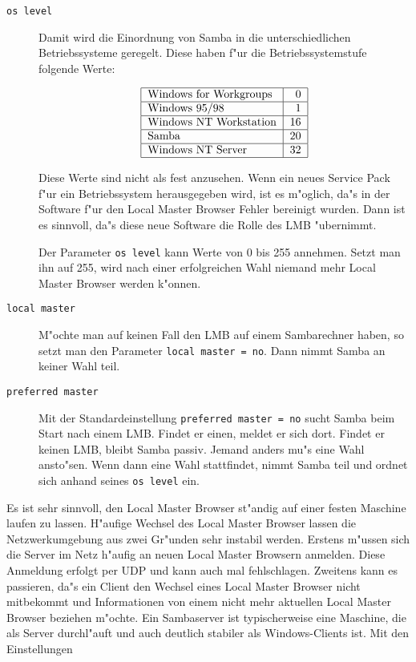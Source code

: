 \documentclass{scrartcl}\usepackage{pslatex}\typearea{12}
\newcommand{\param}{\texttt}
\begin{document}
\begin{description}
  
\item[\param{os level}] Damit wird die Einordnung von Samba in die
  unterschiedlichen Betriebssysteme geregelt. Diese haben f"ur die
  Betriebssystemstufe folgende Werte:

\[\begin{tabular}{|l|r|}
\hline
Windows for Workgroups & 0 \\
\hline
Windows 95/98 & 1 \\
\hline
Windows NT Workstation & 16 \\
\hline
Samba & 20 \\
\hline
Windows NT Server & 32 \\
\hline
\end{tabular}\]

Diese Werte sind nicht als fest anzusehen. Wenn ein neues Service Pack
f"ur ein Betriebssystem herausgegeben wird, ist es m"oglich, da"s in
der Software f"ur den Local Master Browser Fehler bereinigt wurden.
Dann ist es sinnvoll, da"s diese neue Software die Rolle des LMB
"ubernimmt.

Der Parameter \param{os level} kann Werte von 0 bis 255 annehmen.
Setzt man ihn auf 255, wird nach einer erfolgreichen Wahl niemand mehr
Local Master Browser werden k"onnen.

\item[\param{local master}] M"ochte man auf keinen Fall den LMB auf
  einem Sambarechner haben, so setzt man den Parameter \param{local
    master = no}. Dann nimmt Samba an keiner Wahl teil.
  
\item[\param{preferred master}] Mit der Standardeinstellung
  \param{preferred master = no} sucht Samba beim Start nach
  einem LMB. Findet er einen, meldet er sich dort.  Findet er keinen
  LMB, bleibt Samba passiv. Jemand anders mu"s eine Wahl ansto"sen.
  Wenn dann eine Wahl stattfindet, nimmt Samba teil und ordnet sich
  anhand seines \param{os level} ein.

\end{description}

Es ist sehr sinnvoll, den Local Master Browser st"andig auf einer
festen Maschine laufen zu lassen. H"aufige Wechsel des Local Master
Browser lassen die Netzwerkumgebung aus zwei Gr"unden sehr instabil
werden. Erstens m"ussen sich die Server im Netz h"aufig an neuen Local
Master Browsern anmelden. Diese Anmeldung erfolgt per UDP und kann
auch mal fehlschlagen. Zweitens kann es passieren, da"s ein Client den
Wechsel eines Local Master Browser nicht mitbekommt und Informationen
von einem nicht mehr aktuellen Local Master Browser beziehen m"ochte.
Ein Sambaserver ist typischerweise eine Maschine, die als Server
durchl"auft und auch deutlich stabiler als Windows-Clients ist. Mit
den Einstellungen
\end{document}
